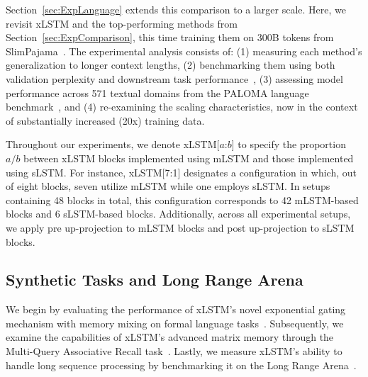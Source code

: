 Section~\ref{sec:ExpLanguage} extends this comparison to a larger scale. Here, we revisit xLSTM and the top-performing methods from Section~\ref{sec:ExpComparison}, this time training them on 300B tokens from SlimPajama~\citep{Soboleva:23}. The experimental analysis consists of: (1) measuring each method's generalization to longer context lengths, (2) benchmarking them using both validation perplexity and downstream task performance~\citep{Sutawika:24}, (3) assessing model performance across 571 textual domains from the PALOMA language benchmark~\citep{Magnusson:23arxivshort}, and (4) re-examining the scaling characteristics, now in the context of substantially increased (20x) training data.

\label{sec:xlstm_blocks_notation}
Throughout our experiments, we denote xLSTM[$a$:$b$] to specify the proportion $a/b$ between xLSTM blocks implemented using mLSTM and those implemented using sLSTM. For instance, xLSTM[7:1] designates a configuration in which, out of eight blocks, seven utilize mLSTM while one employs sLSTM. In setups containing 48 blocks in total, this configuration corresponds to 42 mLSTM-based blocks and 6 sLSTM-based blocks. Additionally, across all experimental setups, we apply pre up-projection to mLSTM blocks and post up-projection to sLSTM blocks.

\subsection{Synthetic Tasks and Long Range Arena}
\label{sec:ExpSyntethic}
We begin by evaluating the performance of xLSTM's novel exponential gating mechanism with memory mixing on formal language tasks~\citep{Deletang:23}. Subsequently, we examine the capabilities of xLSTM's advanced matrix memory through the Multi-Query Associative Recall task~\citep{Arora:23arxiv}. Lastly, we measure xLSTM's ability to handle long sequence processing by benchmarking it on the Long Range Arena~\citep{Tay:21}.

